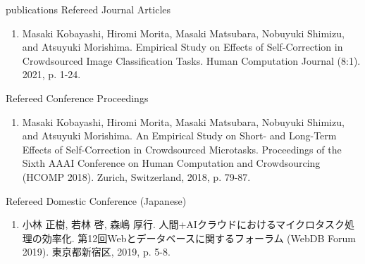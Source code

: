 \documentclass{resume} %
\begin{document}
\begin{rSection}{publications}
Refereed Journal Articles
\begin{enumerate}
  \setcounter{enumi}{0}
  \item Masaki Kobayashi, Hiromi Morita, Masaki Matsubara, Nobuyuki Shimizu, and Atsuyuki Morishima. Empirical Study on Effects of Self-Correction in Crowdsourced Image Classification Tasks. Human Computation Journal (8:1). 2021, p. 1-24.
\end{enumerate}

\newpage

Refereed Conference Proceedings
\begin{enumerate}
  \setcounter{enumi}{0}
  \item Masaki Kobayashi, Hiromi Morita, Masaki Matsubara, Nobuyuki Shimizu, and Atsuyuki Morishima. An Empirical Study on Short- and Long-Term Effects of Self-Correction in Crowdsourced Microtasks. Proceedings of the Sixth AAAI Conference on Human Computation and Crowdsourcing (HCOMP 2018). Zurich, Switzerland, 2018, p. 79-87.
\end{enumerate}

Refereed Domestic Conference (Japanese)
\begin{enumerate}
  \setcounter{enumi}{0}
  \item 小林 正樹, 若林 啓, 森嶋 厚行. 人間+AIクラウドにおけるマイクロタスク処理の効率化. 第12回Webとデータベースに関するフォーラム (WebDB Forum 2019). 東京都新宿区, 2019, p. 5-8.
\end{enumerate}




\end{rSection}
\end{document}
